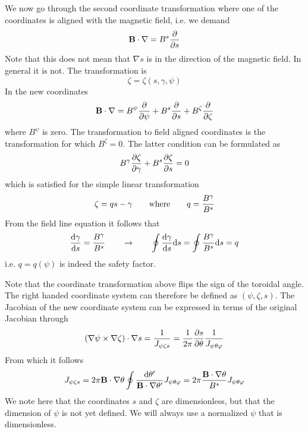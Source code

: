 We now go through the second coordinate transformation where one of the coordinates is 
aligned with the magnetic field, i.e. we demand 
\begin{equation} 
{\bf B} \cdot \nabla = B^s {\partial \over \partial s}
\end{equation}
Note that this does not mean that $\nabla s$ is in the direction of the magnetic field. 
In general it is not. The transformation is 
\begin{equation} 
\zeta = \zeta(s,\gamma,\psi) 
\end{equation}
In the new coordinates 
\begin{equation}
{\bf B}\cdot \nabla =B^{\psi}{\partial \over \partial \psi}+B^{s}{\partial \over \partial s}+
B^{\zeta}{\partial \over \partial \zeta}
\end{equation}
where $B^\psi$ is zero. The transformation to field aligned coordinates is the transformation 
for which $B^\zeta = 0$. The latter condition can be formulated as 
\begin{equation} 
B^\gamma {\partial \zeta \over \partial \gamma} + B^s {\partial \zeta \over \partial s} = 0
\end{equation} 
which is satisfied for the simple linear transformation
\begin{equation} 
\zeta =  q s - \gamma \qquad {\rm where} \qquad q = {B^\gamma \over B^s} 
\end{equation}
From the field line equation it follows that 
\begin{equation} 
{{\rm d} \gamma \over {\rm d} s} = {B^\gamma \over B^s} \qquad \rightarrow \qquad 
\oint {{\rm d} \gamma \over {\rm d} s} {\rm d} s = \oint {B^\gamma \over B^s} {\rm d} s = q 
\end{equation} 
i.e. $q = q(\psi)$ is indeed the safety factor. 

Note that the coordinate transformation above flips the sign of the toroidal angle. 
The right handed coordinate system can therefore be defined as $(\psi,\zeta,s)$. 
The Jacobian of the new coordinate system can be expressed in terms of the original 
Jacobian through 
\begin{equation} 
(\nabla \psi \times \nabla \zeta) \cdot \nabla s = {1 \over J_{\psi  \zeta s} } = 
{1\over 2 \pi}{\partial s \over \partial \theta} {1 \over J_{\psi \theta \varphi}} 
\end{equation} 
From which it follows 
\begin{equation} 
J_{\psi  \zeta s} = 2\pi {\bf B} \cdot \nabla \theta \oint {{\rm d} \theta^\prime \over 
{{\bf B} \cdot \nabla \theta^\prime}} J_{\psi \theta \varphi}  = 
2 \pi {{\bf B} \cdot \nabla \theta \over B^s } J_{\psi \theta \varphi}
\end{equation} 
We note here that the coordinates $s$ and $\zeta$ are dimensionless, but that the 
dimension of $\psi$ is not yet defined. We will always use a normalized $\psi$ that 
is dimensionless. 


